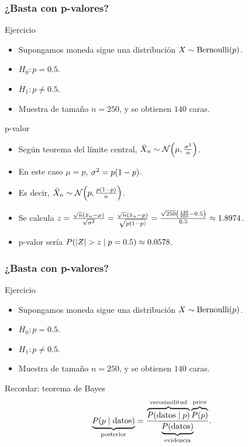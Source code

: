 \documentclass[table]{beamer}
\begin{document}
\begin{frame}
    \frametitle{¿Basta con p-valores?}
    \begin{block}{Ejercicio}
        \begin{itemize}
            \item Supongamos moneda sigue una distribución $X \sim \bernoulli{p}$.
            \item $H_{0}: p = 0.5$.
            \item $H_{1}: p \neq 0.5$.
            \item Muestra de tamaño $n = 250$, y se obtienen $140$ caras.
        \end{itemize}
    \end{block}
    \begin{block}{p-valor}
        \begin{itemize}
            \item Según teorema del límite central, $\bar{X}_{n} \sim \normal{\mu}{\frac{\sigma^{2}}{n}}$.
            \item En este caso $\mu = p$, $\sigma^{2} = p \parens{1 - p}$.
            \item Es decir, $\bar{X}_{n} \sim \normal{p}{\frac{p \parens{1 - p}}{n}}$.
            \item Se calcula $z = \frac{\sqrt{n} \parens{\bar{x}_{n} - \mu}}{\sqrt{\sigma^{2}}} = \frac{\sqrt{n} \parens{\bar{x}_{n} - p}}{\sqrt{p \parens{1 - p}}} = \frac{\sqrt{250} \parens{\frac{140}{250} - 0.5}}{0.5} \approx 1.8974$.
            \item p-valor sería $\prob{\vparens{Z} > z \mid p = 0.5} \approx 0.0578$.
        \end{itemize}
    \end{block}
\end{frame}

\begin{frame}
    \frametitle{¿Basta con p-valores?}
    \begin{block}{Ejercicio}
        \begin{itemize}
            \item Supongamos moneda sigue una distribución $X \sim \bernoulli{p}$.
            \item $H_{0}: p = 0.5$.
            \item $H_{1}: p \neq 0.5$.
            \item Muestra de tamaño $n = 250$, y se obtienen $140$ caras.
        \end{itemize}
    \end{block}
    \begin{block}{Recordar: teorema de Bayes}
        \begin{equation*}
            \underbrace{\prob{p \mid \text{datos}}}_{\text{posterior}} = \frac{\overbrace{\prob{\text{datos} \mid p}}^{\text{verosimilitud}} \overbrace{\prob{p}}^{\text{prior}}}{\underbrace{\prob{\text{datos}}}_{\text{evidencia}}} .
        \end{equation*}
    \end{block}
\end{frame}
\end{document}
